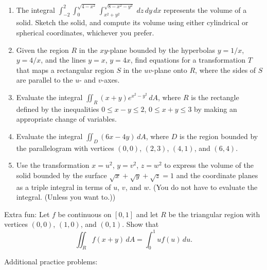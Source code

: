 \documentclass[letterpaper,12pt]{article}
\newcommand{\di}{\displaystyle}
\begin{document}
\begin{enumerate}

 \item The integral $\di \int_{-2}^2\int_0^{\sqrt{4-x^2}}\int_{x^2+y^2}^{\sqrt{8-x^2-y^2}}\,dz\,dy\,dx$ represents the volume of a solid. Sketch the solid, and compute its volume using either cylindrical or spherical coordinates, whichever you prefer.
 \item  Given the region $R$ in the $xy$-plane bounded by the hyperbolas $y=1/x$, $y=4/x$, and the lines $y=x$, $y=4x$, find equations for a transformation $T$ that maps a rectangular region $S$ in the $uv$-plane onto $R$, where the sides of $S$ are parallel to the $u$- and $v$-axes.

\item  Evaluate the integral $\di \iint_R (x+y)e^{x^2-y^2}\,dA$, where $R$ is the rectangle defined by the inequalities $0\leq x-y\leq 2$, $0\leq x+y\leq 3$ by making an appropriate change of variables.

\item Evaluate the integral $\di \iint_D(6x-4y)\,dA$, where $D$ is the region bounded by the parallelogram with vertices $(0,0)$, $(2,3)$, $(4,1)$, and $(6,4)$.

\item Use the transformation $x=u^2$, $y=v^2$, $z=w^2$ to express the volume of the solid bounded by the surface $\sqrt{x}+\sqrt{y}+\sqrt{z}=1$ and the coordinate planes as a triple integral in terms of $u$, $v$, and $w$. (You do not have to evaluate the integral. (Unless you want to.))

\end{enumerate}



Extra fun:  Let $f$ be continuous on $[0,1]$ and let $R$ be the triangular region with vertices $(0,0)$, $(1,0)$, and $(0,1)$. Show that
\[
\iint_R f(x+y)\,dA = \int_0^1uf(u)\,du.
\]

\pagebreak


Additional practice problems:
\end{document}
